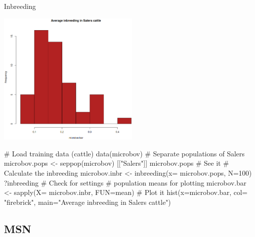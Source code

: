 \documentclass[compress, ucs, xelatex, 11pt, xcolor=svgnames, aspectratio=169,
	hyperref={
		bookmarks=true,
		unicode=true,
		colorlinks=true,
		pdftitle={Molecular data in R},
		plainpages=false,
		pdfauthor={Vojtech Zeisek},
		pdfsubject={Course about phylogeny and evolution in R},
		pdfcreator={XeLaTeX},
		pdfkeywords={R, evolution, phylogeny, molecular data},
		linkcolor=Crimson, %
		anchorcolor=Magenta, %
		citecolor=Magenta, %
		filecolor=Magenta, %
		menucolor=Magenta, %
		urlcolor=DodgerBlue, %
		pdftex},
	url={hyphens, lowtilde} %
	]{beamer}
\begin{document}
\begin{frame}[fragile]{Inbreeding}
	\begin{multicols}{2}
		\includegraphics[height=6.5cm]{inbreeding.png}
		\begin{spluscode}
    # Load training data (cattle)
    data(microbov)
    # Separate populations of Salers
    microbov.pops <- seppop(microbov)
      [["Salers"]]
    microbov.pops # See it
    # Calculate the inbreeding
    microbov.inbr <- inbreeding(x=
      microbov.pops, N=100)
    ?inbreeding # Check for settings
    # population means for plotting
    microbov.bar <- sapply(X=
      microbov.inbr, FUN=mean)
    # Plot it
    hist(x=microbov.bar, col=
      "firebrick", main="Average
      inbreeding in Salers cattle")
		\end{spluscode}
	\end{multicols}
\end{frame}


\subsection{MSN}
\end{document}
